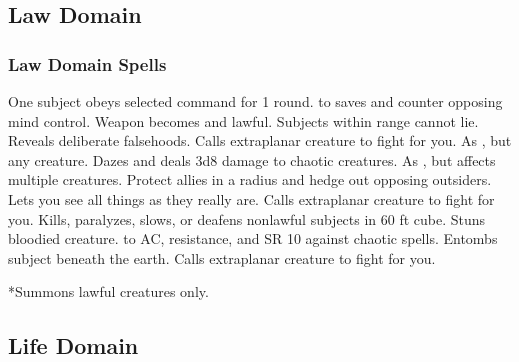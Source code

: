 \subsection{Law Domain}

\subsubsection{Law Domain Spells}
\begin{spelllist}
   One subject obeys selected command for 1 round.
    to saves and counter opposing mind control.
   Weapon becomes  and lawful.
   Subjects within range cannot lie.
   Reveals deliberate falsehoods.
   Calls extraplanar creature to fight for you.
   As , but any creature.
   Dazes and deals 3d8 damage to chaotic creatures.
   As , but affects multiple creatures.
   Protect allies in a \areamed radius and hedge out opposing outsiders.
  \M Lets you see all things as they really are.
   Calls extraplanar creature to fight for you.
   Kills, paralyzes, slows, or deafens nonlawful subjects in 60 ft cube.
   Stuns bloodied creature.
  \spellhead[8]{}
  \F {} to AC,  resistance, and SR 10 against chaotic spells.
   Entombs subject beneath the earth.
   Calls extraplanar creature to fight for you.
\end{spelllist}
*Summons lawful creatures only.

\subsection{Life Domain}

